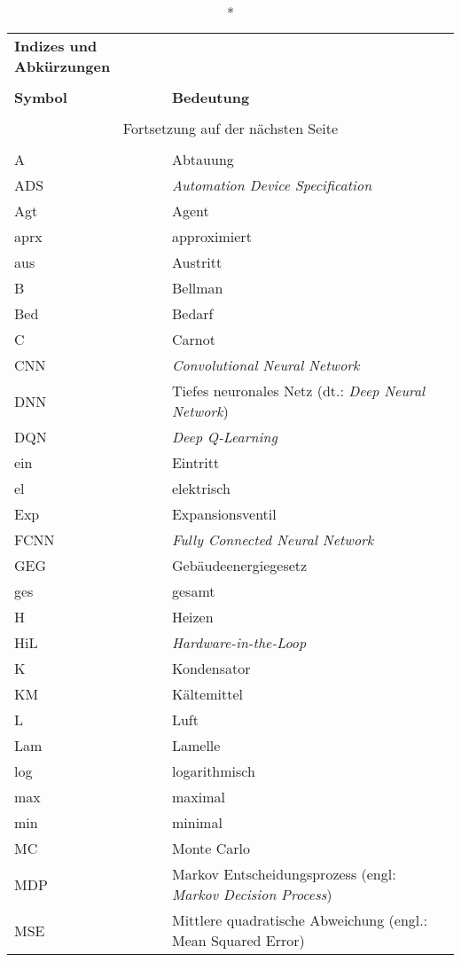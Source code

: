 \begin{onehalfspacing}
\begin{longtable}[h]{p{} p{} p{}}
	
\end{longtable}
\newpage
\begin{longtable}[h]{p{} p{}}
		\caption*{\textbf{Indizes und Abkürzungen}} \\
		\\
		\textbf{Symbol} & \textbf{Bedeutung} \\ %
		\endhead
		\\
		\multicolumn{2}{c}{Fortsetzung auf der nächsten Seite} \\
		\endfoot
		\multicolumn{2}{c}{ } \\
		\endlastfoot
		A& Abtauung\\
		ADS& \textit{Automation Device Specification}\\
		Agt& Agent\\
		aprx& approximiert\\
		aus&Austritt\\
		B& Bellman\\
		Bed&Bedarf\\
		C& Carnot\\
		CNN& \textit{Convolutional Neural Network}\\
		DNN& Tiefes neuronales Netz (dt.: \textit{Deep Neural Network})\\
		DQN& \textit{Deep Q-Learning}\\
		ein& Eintritt\\
		el	& elektrisch\\
		Exp& Expansionsventil\\
		FCNN& \textit{Fully Connected Neural Network}\\
		GEG & Gebäudeenergiegesetz\\
		ges & gesamt\\
		H& Heizen\\
		HiL&\textit{Hardware-in-the-Loop}\\
		K & Kondensator\\
		KM& Kältemittel\\
		L& Luft\\
		Lam& Lamelle\\
		log& logarithmisch\\	
		max & maximal\\
		min & minimal\\
		MC& Monte Carlo\\
		MDP& Markov Entscheidungsprozess (engl: \textit{Markov Decision Process})\\
		MSE& Mittlere quadratische Abweichung (engl.: Mean Squared Error)\\

\end{longtable}
\end{onehalfspacing}
